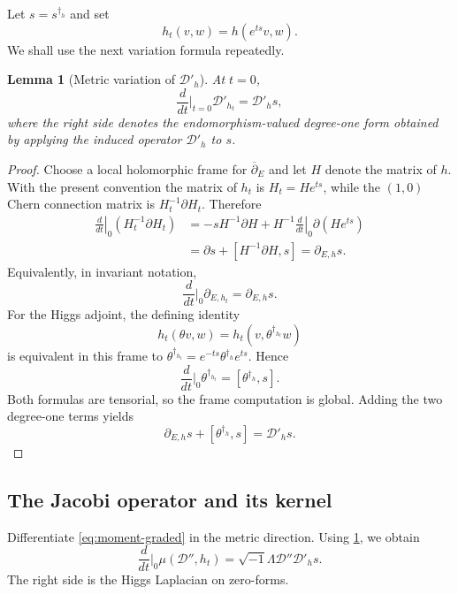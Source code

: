\documentclass[11pt,reqno]{amsart}
\newtheorem{lemma}[theorem]{Lemma}
\theoremstyle{definition}
\theoremstyle{remark}
\newcommand{\cD}{\mathcal D}
\newcommand{\ddbar}{\overline\partial}
\begin{document}
Let $s=s^{\dagger_h}$ and set
\[
  h_t(v,w)=h(e^{ts}v,w).
\]
We shall use the next variation formula repeatedly.

\begin{lemma}[Metric variation of $\cD'_h$]\label{lem:variation-Dprime}
At $t=0$,
\begin{equation}\label{eq:variation-Dprime}
  \frac{d}{dt}\bigg|_{t=0}\cD'_{h_t}
  =\cD'_h s,
\end{equation}
where the right side denotes the endomorphism-valued degree-one form obtained by applying the induced operator $\cD'_h$ to $s$.
\end{lemma}

\begin{proof}
Choose a local holomorphic frame for $\ddbar_E$ and let $H$ denote the
matrix of $h$.  With the
present convention the matrix of $h_t$ is $H_t=He^{ts}$, while the
$(1,0)$ Chern connection matrix is $H_t^{-1}\partial H_t$.  Therefore
\begin{align*}
 \left.\frac d{dt}\right|_0(H_t^{-1}\partial H_t)
 &= -sH^{-1}\partial H
    +H^{-1}\left.\frac d{dt}\right|_0\partial(He^{ts})\\
 &=\partial s+[H^{-1}\partial H,s]
 =\partial_{E,h}s.
\end{align*}
Equivalently, in invariant notation,
\[
  \frac{d}{dt}\bigg|_0\partial_{E,h_t}=\partial_{E,h}s.
\]
For the Higgs adjoint, the defining identity
\[
  h_t(\theta v,w)=h_t(v,\theta^{\dagger_{h_t}}w)
\]
is equivalent in this frame to
$\theta^{\dagger_{h_t}}=e^{-ts}\theta^{\dagger_h}e^{ts}$.  Hence
\[
  \frac{d}{dt}\bigg|_0\theta^{\dagger_{h_t}}
  =[\theta^{\dagger_h},s].
\]
Both formulas are tensorial, so the frame computation is global.
Adding the two degree-one terms yields
\[
  \partial_{E,h}s+[\theta^{\dagger_h},s]=\cD'_hs.
\]
\end{proof}

\subsection{The Jacobi operator and its kernel}

Differentiate \eqref{eq:moment-graded} in the metric direction.  Using \cref{lem:variation-Dprime}, we obtain
\begin{equation}\label{eq:metric-linearization-raw}
  \frac{d}{dt}\bigg|_0\mu(\cD'',h_t)
  =\sqrt{-1}\Lambda\cD''\cD'_h s.
\end{equation}
The right side is the Higgs Laplacian on zero-forms.
\end{document}
